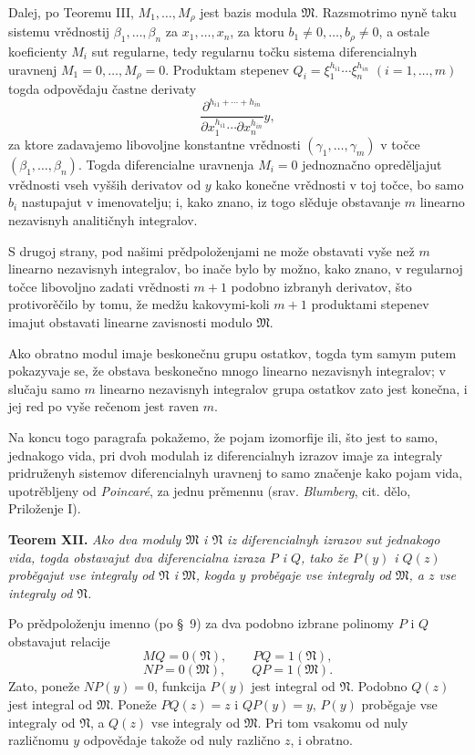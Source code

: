 \documentclass[11pt]{article}
\begin{document}
Dalej, po Teoremu III, \(M_1,
\ldots,M_\rho\) jest bazis modula \(\mathfrak M\). Razsmotrimo nyně taku sistemu vrědnostij \(\beta_1,
\ldots,\beta_n\) za \(x_1,
\ldots,x_n\), za ktoru \(b_1\ne0,
\ldots,b_\rho\ne0\), a ostale koeficienty \(M_i\) sut regularne, tedy regularnu točku sistema diferencialnyh uravnenj \(M_1=0,
\ldots,M_\rho=0\). Produktam stepenev \(Q_i=\xi_1^{h_{i1}}\cdots\xi_n^{h_{in}}\) \((i=1,
\ldots,m)\) togda odpovědaju častne derivaty
\[
 \frac{\partial^{h_{i1}+\cdots+h_{in}}}{\partial x_1^{h_{i1}}\cdots\partial x_n^{h_{in}}}y,
\]
za ktore zadavajemo libovoljne konstantne vrědnosti \((\gamma_1,
\ldots,\gamma_m)\) v točce \((\beta_1,
\ldots,\beta_n)\). Togda diferencialne uravnenja \(M_i=0\) jednoznačno opreděljajut vrědnosti vseh vyšših derivatov od \(y\) kako konečne vrědnosti v toj točce, bo samo \(b_i\) nastupajut v imenovatelju; i, kako znano, iz togo slěduje obstavanje \(m\) linearno nezavisnyh analitičnyh integralov.

S drugoj strany, pod našimi prědpoloženjami ne može obstavati vyše než \(m\) linearno nezavisnyh integralov, bo inače bylo by možno, kako znano, v regularnoj točce libovoljno zadati vrědnosti \(m+1\) podobno izbranyh derivatov, što protivorěčilo by tomu, že medžu kakovymi-koli \(m+1\) produktami stepenev imajut obstavati linearne zavisnosti modulo \(\mathfrak M\).

Ako obratno modul imaje beskonečnu grupu ostatkov, togda tym samym putem pokazyvaje se, že obstava beskonečno mnogo linearno nezavisnyh integralov; v slučaju samo \(m\) linearno nezavisnyh integralov grupa ostatkov zato jest konečna, i jej red po vyše rečenom jest raven \(m\).

Na koncu togo paragrafa pokažemo, že pojam izomorfije ili, što jest to samo, jednakogo vida, pri dvoh modulah iz diferencialnyh izrazov imaje za integraly pridruženyh sistemov diferencialnyh uravnenj to samo značenje kako pojam vida, upotrěbljeny od \emph{Poincaré}, za jednu prěmennu (srav. \emph{Blumberg}, cit. dělo, Priloženje I).

\textbf{Teorem XII.} \textit{Ako dva moduly \(\mathfrak M\) i \(\mathfrak N\) iz diferencialnyh izrazov sut jednakogo vida, togda obstavajut dva diferencialna izraza \(P\) i \(Q\), tako že \(P(y)\) i \(Q(z)\) proběgajut vse integraly od \(\mathfrak N\) i \(\mathfrak M\), kogda \(y\) proběgaje vse integraly od \(\mathfrak M\), a \(z\) vse integraly od \(\mathfrak N\).}

Po prědpoloženju imenno (po \S~9) za dva podobno izbrane polinomy \(P\) i \(Q\) obstavajut relacije
\[
 MQ=0(\mathfrak N),\qquad PQ=1(\mathfrak N),
\]
\[
 NP=0(\mathfrak M),\qquad QP=1(\mathfrak M).
\]
Zato, poneže \(NP(y)=0\), funkcija \(P(y)\) jest integral od \(\mathfrak N\). Podobno \(Q(z)\) jest integral od \(\mathfrak M\). Poneže \(PQ(z)=z\) i \(QP(y)=y\), \(P(y)\) proběgaje vse integraly od \(\mathfrak N\), a \(Q(z)\) vse integraly od \(\mathfrak M\). Pri tom vsakomu od nuly različnomu \(y\) odpovědaje takože od nuly različno \(z\), i obratno.
\end{document}
